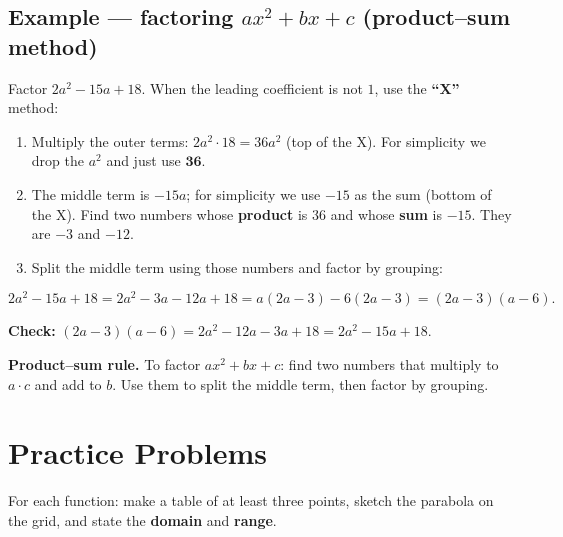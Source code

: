 \documentclass[11pt]{article}
\begin{document}
\subsection{Example --- factoring $ax^2 + bx + c$ (product--sum method)}

Factor $2a^2 - 15a + 18$. When the leading coefficient is not $1$, use the \textbf{``X''} method:

\begin{enumerate}[leftmargin=1.6em,itemsep=2pt]
\item Multiply the outer terms: $2a^2 \cdot 18 = 36a^2$ (top of the X). For simplicity we
      drop the $a^2$ and just use $\mathbf{36}$.
\item The middle term is $-15a$; for simplicity we use $-15$ as the sum (bottom of the X).
      Find two numbers whose \textbf{product} is $36$ and whose \textbf{sum} is $-15$.
      They are $-3$ and $-12$.
\item Split the middle term using those numbers and factor by grouping:
\end{enumerate}
\[
2a^2 - 15a + 18 = 2a^2 - 3a - 12a + 18 = a(2a - 3) - 6(2a - 3) = (2a - 3)(a - 6).
\]

\begin{center}
\end{center}

\textbf{Check:} $(2a-3)(a-6) = 2a^2 - 12a - 3a + 18 = 2a^2 - 15a + 18$. \checkmark

\begin{keybox}
\textbf{Product--sum rule.} To factor $ax^2 + bx + c$: find two numbers that multiply to
$a\cdot c$ and add to $b$. Use them to split the middle term, then factor by grouping.
\end{keybox}

\newpage
\section{Practice Problems}

For each function: make a table of at least three points, sketch the parabola on the grid,
and state the \textbf{domain} and \textbf{range}.
\end{document}
